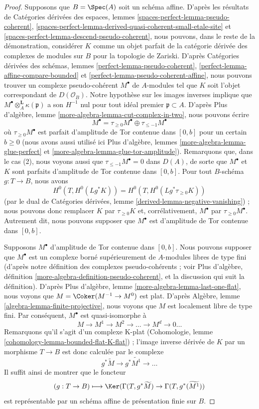 \begin{proof}
\medskip\noindent
Supposons que $B = \Spec(A)$ soit un schéma affine. D'après les résultats de
Catégories dérivées des espaces, lemmes
\ref{spaces-perfect-lemma-pseudo-coherent},
\ref{spaces-perfect-lemma-derived-quasi-coherent-small-etale-site} et
\ref{spaces-perfect-lemma-descend-pseudo-coherent}, nous pouvons, dans le reste
de la démonstration, considérer $K$ comme un objet parfait de la catégorie
dérivée des complexes de modules sur $B$ pour la topologie de Zariski.
D'après Catégories dérivées des schémas, lemmes
\ref{perfect-lemma-pseudo-coherent},
\ref{perfect-lemma-affine-compare-bounded} et
\ref{perfect-lemma-pseudo-coherent-affine}, nous pouvons trouver un complexe
pseudo-cohérent $M^\bullet$ de $A$-modules tel que $K$ soit l'objet
correspondant de $D(\mathcal{O}_B)$. Notre hypothèse sur les images inverses
implique que $M^\bullet \otimes^\mathbf{L}_A \kappa(\mathfrak p)$ a son
$H^{-1}$ nul pour tout idéal premier $\mathfrak p \subset A$. D'après Plus
d'algèbre, lemme \ref{more-algebra-lemma-cut-complex-in-two}, nous pouvons
écrire
$$
M^\bullet =
\tau_{\geq 0}M^\bullet \oplus \tau_{\leq - 1}M^\bullet
$$
où $\tau_{\geq 0}M^\bullet$ est parfait d'amplitude de Tor contenue dans
$[0, b]$ pour un certain $b \geq 0$ (nous avons aussi utilisé ici Plus
d'algèbre, lemmes \ref{more-algebra-lemma-glue-perfect} et
\ref{more-algebra-lemma-glue-tor-amplitude}). Remarquons que, dans le cas (2),
nous voyons aussi que $\tau_{\leq - 1}M^\bullet = 0$ dans $D(A)$, de sorte que
$M^\bullet$ et $K$ sont parfaits d'amplitude de Tor contenue dans $[0, b]$.
Pour tout $B$-schéma $g : T \to B$, nous avons
$$
H^0(T, H^0(Lg^*K)) = H^0(T, H^0(Lg^*\tau_{\geq 0}K))
$$
(par le dual de Catégories dérivées, lemme
\ref{derived-lemma-negative-vanishing}) ; nous pouvons donc remplacer $K$ par
$\tau_{\geq 0}K$ et, corrélativement, $M^\bullet$ par
$\tau_{\geq 0}M^\bullet$. Autrement dit, nous pouvons supposer que
$M^\bullet$ est d'amplitude de Tor contenue dans $[0, b]$.

\medskip\noindent
Supposons $M^\bullet$ d'amplitude de Tor contenue dans $[0, b]$. Nous pouvons
supposer que $M^\bullet$ est un complexe borné supérieurement de $A$-modules
libres de type fini (d'après notre définition des complexes pseudo-cohérents ;
voir Plus d'algèbre, définition
\ref{more-algebra-definition-pseudo-coherent}, et la discussion qui suit la
définition). D'après Plus d'algèbre, lemme
\ref{more-algebra-lemma-last-one-flat}, nous voyons que
$M = \Coker(M^{- 1} \to M^0)$ est plat. D'après Algèbre, lemme
\ref{algebra-lemma-finite-projective}, nous voyons que $M$ est localement
libre de type fini. Par conséquent, $M^\bullet$ est quasi-isomorphe à
$$
M \to M^1 \to M^2 \to \ldots \to M^d \to 0 \ldots
$$
Remarquons qu'il s'agit d'un complexe K-plat (Cohomologie, lemme
\ref{cohomology-lemma-bounded-flat-K-flat}) ; l'image inverse dérivée de $K$
par un morphisme $T \to B$ est donc calculée par le complexe
$$
g^*\widetilde{M} \to g^*\widetilde{M^1} \to \ldots
$$
Il suffit ainsi de montrer que le foncteur
$$
(g : T \to B) \longmapsto
\Ker(
\Gamma(T,g^*\widetilde{M})
\to
\Gamma(T, g^*(\widetilde{M^1})
)
$$
est représentable par un schéma affine de présentation finie sur $B$.


\end{proof}
